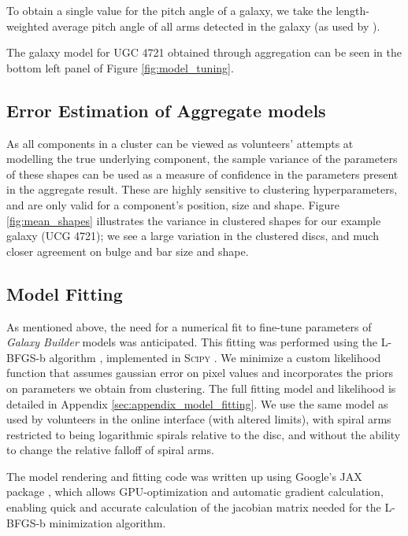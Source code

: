 \documentclass[../main.tex]{subfiles}
\begin{document}
To obtain a single value for the pitch angle of a galaxy, we take the length-weighted average pitch angle of all arms detected in the galaxy (as used by \citealt{Davis2014:1402.1910v1}).

The galaxy model for UGC 4721 obtained through aggregation can be seen in the bottom left panel of Figure \ref{fig:model_tuning}.


\subsection{Error Estimation of Aggregate models}
\label{sec:error_estimation}

As all components in a cluster can be viewed as volunteers' attempts at modelling the true underlying component, the sample variance of the parameters of these shapes can be used as a measure of confidence in the parameters present in the aggregate result. These are highly sensitive to clustering hyperparameters, and are only valid for a component's position, size and shape. Figure \ref{fig:mean_shapes} illustrates the variance in clustered shapes for our example galaxy (UCG 4721); we see a large variation in the clustered discs, and much closer agreement on bulge and bar size and shape.

\subsection{Model Fitting}

As mentioned above, the need for a numerical fit to fine-tune parameters of \textit{Galaxy Builder} models was anticipated. This fitting was performed using the L-BFGS-b algorithm \citep{doi:10.1137/0916069}, implemented in \textsc{Scipy} \citep{scipy-paper}. We minimize a custom likelihood function that assumes gaussian error on pixel values and incorporates the priors on parameters we obtain from clustering. The full fitting model and likelihood is detailed in Appendix \ref{sec:appendix_model_fitting}. We use the same model as used by volunteers in the online interface (with altered limits), with spiral arms restricted to being logarithmic spirals relative to the disc, and without the ability to change the relative falloff of spiral arms.

The model rendering and fitting code was written up using Google's JAX package \citep{jax2018github}, which allows GPU-optimization and automatic gradient calculation, enabling quick and accurate calculation of the jacobian matrix needed for the L-BFGS-b minimization algorithm.
\end{document}
